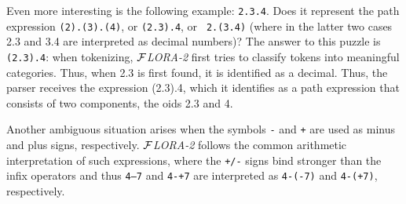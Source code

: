 \documentclass[11pt]{article}
\newcommand{\FLORA}{{\mbox{${\cal F}${\small\it LORA}\rm\emph{-2}}}\xspace}
\begin{document}
Even more interesting is the following example: {\tt 2.3.4}. Does it
represent the path expression {\tt (2).(3).(4)}, or {\tt (2.3).4}, or {\tt
  2.(3.4)} (where in the latter two cases 2.3 and 3.4 are interpreted as
decimal numbers)? The answer to this puzzle is {\tt (2.3).4}: when
tokenizing, \FLORA first tries to classify tokens into meaningful
categories. Thus, when 2.3 is first found, it is identified as a
decimal. Thus, the parser receives the expression (2.3).4, which it
identifies as a path expression that consists of two components, the oids
2.3 and 4.

Another ambiguous situation arises when the symbols {\tt -} and {\tt +} are
used as minus and plus
signs, respectively. \FLORA follows the common arithmetic interpretation of
such expressions, where the {\tt +/-} signs bind stronger than the infix
operators and thus
{\tt 4--7} and {\tt 4-+7} are interpreted as {\tt 4-(-7)} and {\tt 4-(+7)},
respectively.
\end{document}
